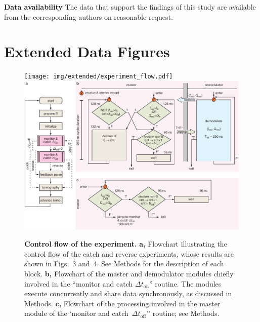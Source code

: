 \documentclass[
	 			preprint,     		superscriptaddress, 																longbibliography,
		amsmath, amssymb,
		aps,  prb,   		floatfix,
		linenumbers     
	]{revtex4-1}
\begin{document}
\footnotesize
\textbf{Data availability}\enspace
The data that support the findings of this study are available from the corresponding authors on reasonable request.
\normalsize


\clearpage
\onecolumngrid
\section*{Extended Data Figures} 

\begin{figure}[!ht]
\begin{centering}
\hspace*{-1cm} \ifjournal
	\texttt{[image: img/extended/experiment\_flow.pdf]} 
\else
	\includegraphics[width=189mm]{experiment_flow.pdf} 
\fi
\par
\caption{ \label{fig:experiment-flow}
\textbf{Control flow of the experiment.} 
\textbf{a,} 
Flowchart illustrating the control flow of the catch and reverse experiments, whose results are shown in Figs.~3 and~4.  See Methods for the description of each block.
\textbf{b,} 
Flowchart  of the master and demodulator modules chiefly involved in the ``monitor and catch $\Delta t _\mathrm{on}$'' routine. The modules execute concurrently and share data synchronously, as discussed in Methods. 
\textbf{c,}
Flowchart of the processing involved in the master module  of the `monitor and catch~$\Delta t _\mathrm{off}$'' routine; see Methods. 
}
\end{centering}
\end{figure}
\end{document}
